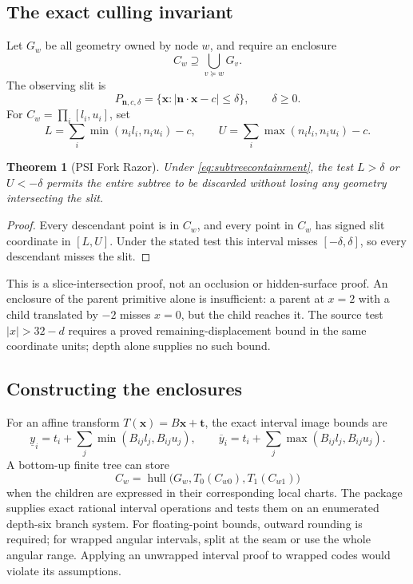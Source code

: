 \documentclass[11pt,a4paper]{article}
\newtheorem{theorem}[proposition]{Theorem}
\numberwithin{equation}{section}
\begin{document}
\subsection{The exact culling invariant}
Let $G_w$ be all geometry owned by node $w$, and require an enclosure
\begin{equation}
C_w\supseteq\bigcup_{v\succeq w}G_v.
\label{eq:subtreecontainment}
\end{equation}
The observing slit is
\begin{equation}
P_{\bm n,c,\delta}=\{\bm x:|\bm n\cdot\bm x-c|\le\delta\},\qquad
\delta\ge0.
\end{equation}
For $C_w=\prod_i[l_i,u_i]$, set
\begin{equation}
L=\sum_i\min(n_i l_i,n_i u_i)-c,\qquad
U=\sum_i\max(n_i l_i,n_i u_i)-c.
\end{equation}
\begin{theorem}[PSI Fork Razor]
Under \eqref{eq:subtreecontainment}, the test $L>\delta$ or $U<-\delta$ permits the entire subtree to be discarded without losing any geometry intersecting the slit.
\end{theorem}
\begin{proof}
Every descendant point is in $C_w$, and every point in $C_w$ has signed slit coordinate in $[L,U]$. Under the stated test this interval misses $[-\delta,\delta]$, so every descendant misses the slit.
\end{proof}
This is a slice-intersection proof, not an occlusion or hidden-surface proof. An enclosure of the parent primitive alone is insufficient: a parent at $x=2$ with a child translated by $-2$ misses $x=0$, but the child reaches it. The source test $|x|>32-d$ requires a proved remaining-displacement bound in the same coordinate units; depth alone supplies no such bound.

\subsection{Constructing the enclosures}
For an affine transform $T(\bm x)=B\bm x+\bm t$, the exact interval image bounds are
\begin{equation}
\underline y_i=t_i+\sum_j\min(B_{ij}l_j,B_{ij}u_j),\qquad
\overline y_i=t_i+\sum_j\max(B_{ij}l_j,B_{ij}u_j).
\end{equation}
A bottom-up finite tree can store
\begin{equation}
C_w=\operatorname{hull}\bigl(G_w,T_0(C_{w0}),T_1(C_{w1})\bigr)
\end{equation}
when the children are expressed in their corresponding local charts. The package supplies exact rational interval operations and tests them on an enumerated depth-six branch system. For floating-point bounds, outward rounding is required; for wrapped angular intervals, split at the seam or use the whole angular range. Applying an unwrapped interval proof to wrapped codes would violate its assumptions.
\end{document}
